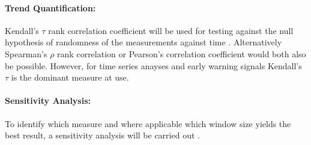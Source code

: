 \paragraph{Trend Quantification:}
Kendall's $\tau$ rank correlation coefficient will be used for testing against the null hypothesis of randomness of the measurements against time \citep{dakos2012}. Alternatively Spearman's $\rho$ rank correlation or Pearson's correlation coefficient would both also be possible. However, for time series anayses and early warning signals Kendall's $\tau$ is the dominant measure at use.

\paragraph{Sensitivity Analysis:}
To identify which measure and where applicable which window size yields the best result, a sensitivity analysis will be carried out \citep{dakos2012}. \\


